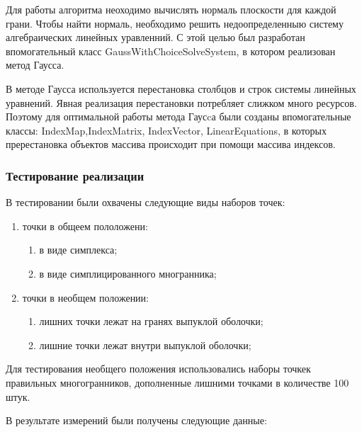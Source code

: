 \documentclass[14pt]{extarticle}
\begin{document}
Для работы алгоритма неоходимо вычислять нормаль плоскости для каждой грани. Чтобы найти нормаль, необходимо решить недоопределенныю систему алгебраических линейных уравленний.  С этой целью был разработан впомогательный класс GaussWithChoiceSolveSystem, в котором реализован метод Гаусса.

В методе Гаусса используется перестановка столбцов и строк системы линейных уравнений. Явная реализация перестановки потребляет слижком много ресурсов.
Поэтому для оптимальной работы метода Гаусcа были созданы впомогательные классы: IndexMap,IndexMatrix, IndexVector, LinearEquations, в которых пререстановка объектов массива происходит при помощи массива индексов.


\subsubsection{Тестирование реализации}
В тестировании были охвачены следующие виды наборов точек:
\begin{enumerate}[topsep=-0.5\parsep,itemsep=-0.5\parsep]
  \item точки в общеем пололожени:
  \begin{enumerate}[topsep=-0.5\parsep,itemsep=-0.5\parsep]
    \item в виде симплекса;
    \item  в виде симплицированного многранника;
  \end{enumerate}
  \item точки в необщем положении:
  \begin{enumerate}[topsep=-0.5\parsep,itemsep=-0.5\parsep]
    \item лишних точки лежат на гранях выпуклой оболочки;
    \item  лишние точки лежат внутри выпуклой оболочки;
  \end{enumerate}
\end{enumerate}
\medskip

Для тестирования необщего положения использовались наборы точкек правильных многогранников, дополненные лишними точками в количестве 100 штук.

В результате измерений были получены следующие данные:
\end{document}
